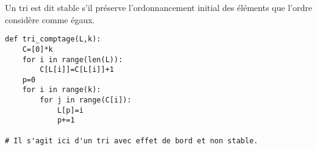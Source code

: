 \begin{defi}
Un tri est dit stable s'il préserve l’ordonnancement initial des éléments que l'ordre considère comme égaux.
\end{defi}

\ifprof
\begin{lstlisting}
def tri_comptage(L,k):
    C=[0]*k
    for i in range(len(L)):
        C[L[i]]=C[L[i]]+1
    p=0
    for i in range(k):
        for j in range(C[i]):
            L[p]=i
            p+=1
            
# Il s'agit ici d'un tri avec effet de bord et non stable. 
\end{lstlisting}
\else
\fi
